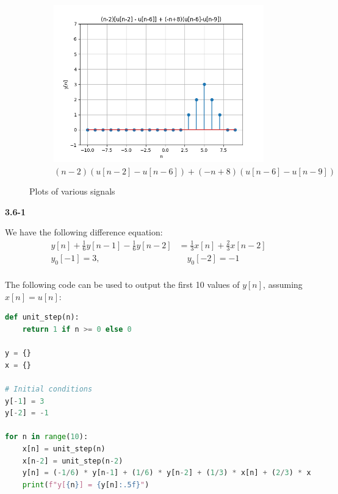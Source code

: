 \documentclass{article}
\begin{document}
\begin{figure}[ht!]
\begin{subfigure}[b]{0.3\textwidth}
        \includegraphics[width=\textwidth]{plot5.png}
        \caption{$(n-2)(u[n-2]-u[n-6])+(-n+8)(u[n-6]-u[n-9])$}
    \end{subfigure}
    \caption{Plots of various signals}
    \label{fig:signals}
\end{figure}

\textbf{3.6-1}

We have the following difference equation:
\begin{align*}
    y[n] + \frac{1}{6}y[n-1] - \frac{1}{6}y[n-2] &= \frac{1}{3}x[n] + \frac{2}{3}x[n-2]\\
    y_0[-1] = 3, &\quad y_0[-2] = -1 \\
\end{align*}

The following code can be used to output the first 10 values of $y[n]$, assuming $x[n] = u[n]$:
\newpage
\begin{lstlisting}[language=Python, label={code:p3}, caption={Python code to solve difference equation}]
def unit_step(n):
    return 1 if n >= 0 else 0

y = {}
x = {}

# Initial conditions
y[-1] = 3
y[-2] = -1

for n in range(10):
    x[n] = unit_step(n)
    x[n-2] = unit_step(n-2)
    y[n] = (-1/6) * y[n-1] + (1/6) * y[n-2] + (1/3) * x[n] + (2/3) * x[n-2]
    print(f"y[{n}] = {y[n]:.5f}")
\end{lstlisting}
\end{document}
